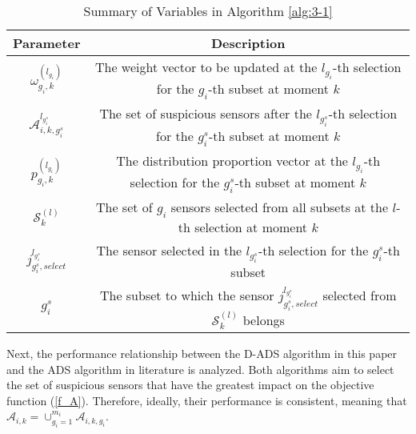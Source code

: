 \begin{table*}[ht]
\small
\renewcommand{\arraystretch}{1.3}
\centering
\caption{Summary of Variables in Algorithm \ref{alg:3-1}}
\begin{tabular*}{0.76\textwidth}{@{\extracolsep{\fill}}cc}
\toprule
Parameter & Description \\
\midrule
$\omega_{g_i,k}^{(l_{g_i})}$ & The weight vector to be updated at the $l_{g_i}$-th selection for the $g_i$-th subset at moment $k$ \\

$\mathcal{A}_{i,k,g_i^s}^{l_{g_i^s}}$ & The set of suspicious sensors after the $l_{g_i^s}$-th selection for the $g_i^s$-th subset at moment $k$ \\

$p_{g_i,k}^{(l_{g_i})}$ & The distribution proportion vector at the $l_{g_i}$-th selection for the $g_i^s$-th subset at moment $k$ \\

$\mathcal{S}^{(l)}_{k}$ & The set of $g_i$ sensors selected from all subsets at the $l$-th selection at moment $k$ \\

$j_{g_i^s,select}^{l_{g_i^s}}$ & The sensor selected in the $l_{g_i^s}$-th selection for the $g_i^s$-th subset \\

$g_i^s$ & The subset to which the sensor $j_{g_i^s,select}^{l_{g_i^s}}$ selected from $\mathcal{S}^{(l)}_{k}$ belongs \\

\bottomrule
\end{tabular*}
\label{tab:distributed parameter}
\end{table*}


Next, the performance relationship between the D-ADS algorithm in this paper and the ADS algorithm in literature \cite{Suo2024Security} is analyzed. Both algorithms aim to select the set of suspicious sensors that have the greatest impact on the objective function (\ref{f_A}). Therefore, ideally, their performance is consistent, meaning that $\mathcal{A}_{i,k} = \cup^{m_i}_{g_i=1}{\mathcal{A}_{i,k,g_i}}
$.

